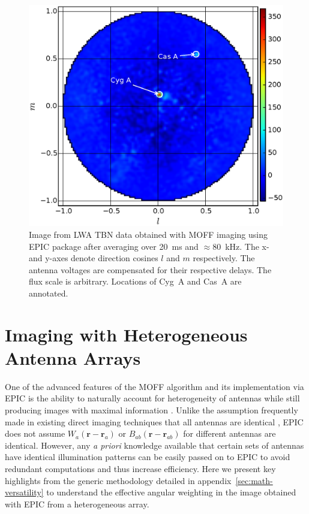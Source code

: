 \documentclass[a4paper,fleqn,usenatbib]{mnras}
\begin{document}
\begin{figure}
  \includegraphics[width=\columnwidth]{figure9}
  \caption{Image from LWA TBN data obtained with MOFF imaging using EPIC package after averaging over 20~ms and $\approx 80$~kHz. The x- and y-axes denote direction cosines $l$ and $m$ respectively. The antenna voltages are compensated for their respective delays. The flux scale is arbitrary. Locations of Cyg~A and Cas~A are annotated.}
  \label{fig:LWA-image}
\end{figure}

\section{Imaging with Heterogeneous Antenna Arrays}\label{sec:versatility}

One of the advanced features of the MOFF algorithm and its implementation via EPIC is the ability to naturally account for heterogeneity of antennas while still producing images with maximal information \citep{mor11}. Unlike the assumption frequently made in existing direct imaging techniques that all antennas are identical \citep{oto94,dai00,teg09,teg10,fos14,zhe14}, EPIC does not assume $W_a(\mathbf{r}-\mathbf{r}_a)$ or $B_{ab}(\mathbf{r}-\mathbf{r}_{ab})$ for different antennas are identical. However, any {\it a priori} knowledge available that certain sets of antennas have identical illumination patterns can be easily passed on to EPIC to avoid redundant computations and thus increase efficiency. Here we present key highlights from the generic methodology detailed in appendix~\ref{sec:math-versatility} to understand the effective angular weighting in the image obtained with EPIC from a heterogeneous array. 
\end{document}
